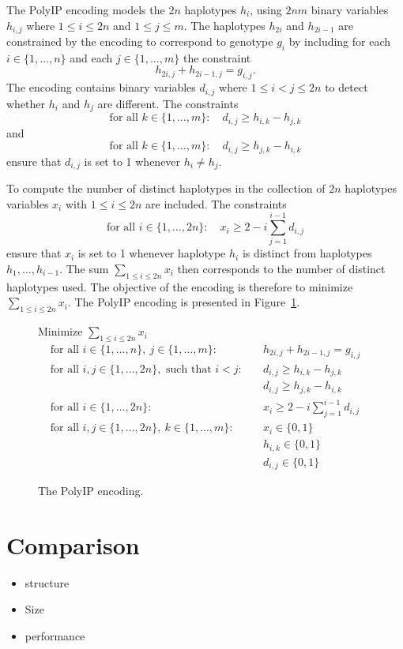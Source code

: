 \documentclass[12pt,a4paper]{article}
\begin{document}
The PolyIP encoding models the $2n$ haplotypes $h_i$, using $2nm$ binary variables $h_{i,j}$ where $1\leq i \leq 2n$ and $1\leq j \leq m$.
The haplotypes $h_{2i}$ and $h_{2i-1}$ are constrained by the encoding to correspond to genotype $g_i$ by including for each $i\in\{1, \dots , n\}$ and each $j\in\{1,\dots ,m\}$ the constraint
$$ h_{2i,j} + h_{2i-1,j} = g_{i,j}. $$
The encoding contains binary variables $d_{i,j}$ where $1\leq i<j\leq 2n$ to detect whether $h_i$ and $h_j$ are different.
The constraints 
$$ \text{for all }k\in\{1,\dots ,m\}:\quad  d_{i,j} \geq h_{i,k}-h_{j,k} $$
and
$$ \text{for all }k\in\{1,\dots ,m\}:\quad  d_{i,j} \geq h_{j,k}-h_{i,k} $$
ensure that $d_{i,j}$ is set to 1 whenever $h_i\neq h_j$.

To compute the number of distinct haplotypes in the collection of $2n$ haplotypes variables $x_i$ with $1\leq i\leq 2n$ are included.
The constraints
$$ \text{for all }i\in\{1,\dots ,2n\}:\quad  x_{i} \geq 2 - i \sum_{j=1}^{i-1} d_{i,j} $$
ensure that $x_i$ is set to 1 whenever haplotype $h_i$ is distinct from haplotypes $h_1,\dots , h_{i-1}$.
The sum $\sum_{1\leq i\leq 2n} x_i$ then corresponds to the number of distinct haplotypes used.
The objective of the encoding is therefore to minimize $\sum_{1\leq i\leq 2n} x_i$.
The PolyIP encoding is presented in Figure~\ref{fig:enc-polyip}.

\begin{figure}
\centering
Minimize $\sum_{1\leq i \leq 2n} x_i$
\begin{align}
\text{for all  }i\in\{1,\dots , n\},\ j\in\{1,\dots ,m\}:&\quad h_{2i,j} + h_{2i-1,j} = g_{i,j} \\
\text{for all  }i, j\in\{1,\dots , 2n\},\text{ such that } i<j:&\quad d_{i,j} \geq h_{i,k}-h_{j,k} \\
&\quad d_{i,j} \geq h_{j,k}-h_{i,k} \\
\text{for all  }i\in\{1,\dots , 2n\}:&\quad x_{i} \geq 2 - i \sum_{j=1}^{i-1} d_{i,j} \\
\text{for all  }i,j\in\{1,\dots , 2n\},\ k\in\{1,\dots ,m\}:&\quad x_i\in\{0,1\} \\
&\quad h_{i,k}\in\{0,1\} \\
&\quad d_{i,j}\in\{0,1\}
\end{align}
\caption{The PolyIP encoding.}
\label{fig:enc-polyip}
\end{figure}

\section{Comparison}

\begin{itemize}
\item structure
\item Size
\item performance
\end{itemize}




\end{document}
